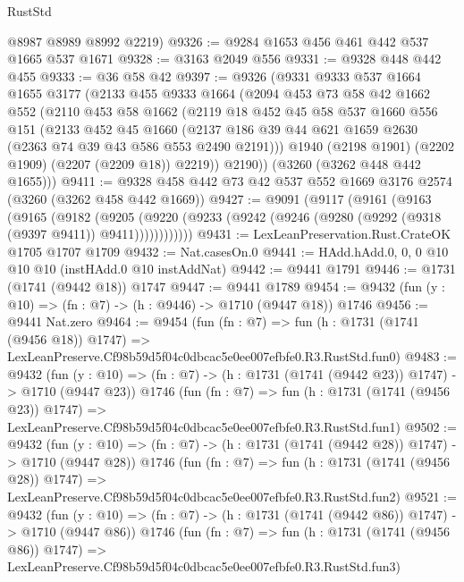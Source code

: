\begin{lexlean}{RustStd}
\begin{coremodule}
      @8987
      @8989
      @8992
      @2219)
@9326 := @9284 @1653 @456 @461 @442 @537 @1665 @537 @1671
@9328 := @3163 @2049 @556
@9331 := @9328 @448 @442 @455
@9333 := @36 @58 @42
@9397 := @9326
    (@9331
      @9333
      @537
      @1664
      @1655
      @3177
      (@2133
        @455
        @9333
        @1664
        (@2094
          @453
          @73
          @58
          @42
          @1662
          @552
          (@2110
            @453
            @58
            @1662
            (@2119
              @18
              @452
              @45
              @58
              @537
              @1660
              @556
              @151
              (@2133
                @452
                @45
                @1660
                (@2137 @186 @39 @44 @621 @1659 @2630 (@2363 @74 @39 @43 @586 @553 @2490 @2191)))
              @1940
              (@2198 @1901)
              (@2202 @1909)
              (@2207 (@2209 @18))
              @2219))
          @2190))
      (@3260 (@3262 @448 @442 @1655)))
@9411 := @9328 @458 @442 @73 @42 @537 @552 @1669 @3176 @2574 (@3260 (@3262 @458 @442 @1669))
@9427 := @9091
    (@9117
      (@9161
        (@9163
          (@9165
            (@9182
              (@9205
                (@9220 (@9233 (@9242 (@9246 (@9280 (@9292 (@9318 (@9397 @9411)) @9411))))))))))))
@9431 := LexLeanPreservation.Rust.CrateOK @1705 @1707 @1709
@9432 := Nat.casesOn.{0}
@9441 := HAdd.hAdd.{0, 0, 0} @10 @10 @10 (instHAdd.{0} @10 instAddNat)
@9442 := @9441 @1791
@9446 := @1731 (@1741 (@9442 @18)) @1747
@9447 := @9441 @1789
@9454 := @9432 (fun (y : @10) => (fn : @7) -> (h : @9446) -> @1710 (@9447 @18)) @1746
@9456 := @9441 Nat.zero
@9464 := @9454
    (fun (fn : @7) =>
    fun (h : @1731 (@1741 (@9456 @18)) @1747) =>
    LexLeanPreserve.Cf98b59d5f04c0dbcac5e0ee007efbfe0.R3.RustStd.fun0)
@9483 := @9432
    (fun (y : @10) => (fn : @7) -> (h : @1731 (@1741 (@9442 @23)) @1747) -> @1710 (@9447 @23))
    @1746
    (fun (fn : @7) =>
    fun (h : @1731 (@1741 (@9456 @23)) @1747) =>
    LexLeanPreserve.Cf98b59d5f04c0dbcac5e0ee007efbfe0.R3.RustStd.fun1)
@9502 := @9432
    (fun (y : @10) => (fn : @7) -> (h : @1731 (@1741 (@9442 @28)) @1747) -> @1710 (@9447 @28))
    @1746
    (fun (fn : @7) =>
    fun (h : @1731 (@1741 (@9456 @28)) @1747) =>
    LexLeanPreserve.Cf98b59d5f04c0dbcac5e0ee007efbfe0.R3.RustStd.fun2)
@9521 := @9432
    (fun (y : @10) => (fn : @7) -> (h : @1731 (@1741 (@9442 @86)) @1747) -> @1710 (@9447 @86))
    @1746
    (fun (fn : @7) =>
    fun (h : @1731 (@1741 (@9456 @86)) @1747) =>
    LexLeanPreserve.Cf98b59d5f04c0dbcac5e0ee007efbfe0.R3.RustStd.fun3)

\end{coremodule}
\end{lexlean}
